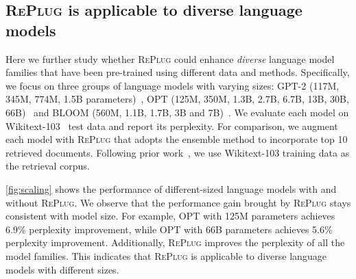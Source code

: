 \documentclass[nohyperref]{article}
\newcommand{\model}{\textsc{RePlug}\xspace}
\theoremstyle{plain}
\theoremstyle{definition}
\theoremstyle{remark}
\begin{document}
\begin{figure*}[ht]
    \centering
    \caption{
   \textbf{GPT-2, BLOOM and OPT models of varying sizes consistently benefit from \model.} 
 The x-axis indicates the size of the language model and the y-axis is its perplexity on Wikitext-103. 
    }
    \label{fig:scaling}
\end{figure*}



\subsection{\model is applicable to diverse language models}
Here we further study whether \model could enhance \textit{diverse} language model families that have been pre-trained using different data and methods.  Specifically, we focus on three groups of language models with varying sizes: GPT-2 (117M, 345M, 774M, 1.5B parameters)~\cite{NEURIPS2020_1457c0d6}, OPT (125M, 350M, 1.3B, 2.7B, 6.7B, 13B, 30B, 66B)~\cite{zhang2022opt} and BLOOM (560M, 1.1B, 1.7B, 3B and 7B)~\cite{scao2022bloom}. We evaluate each model on Wikitext-103~\cite{stephen2017pointer} test data and report its perplexity. For comparison, we augment each model with \model that adopts the ensemble method to incorporate top 10 retrieved documents. Following prior work~\cite{Khandelwal2020Generalization}, we use Wikitext-103 training data as the retrieval corpus. 

\autoref{fig:scaling} shows the performance of different-sized language models with and without \model. We observe that the performance gain brought by \model stays consistent with model size. For example, OPT with 125M parameters achieves 6.9\% perplexity improvement, while OPT with 66B parameters achieves 5.6\% perplexity improvement. Additionally, \model improves the perplexity of all the model families.
This indicates that \model is applicable to diverse language models with different sizes. 
\end{document}
